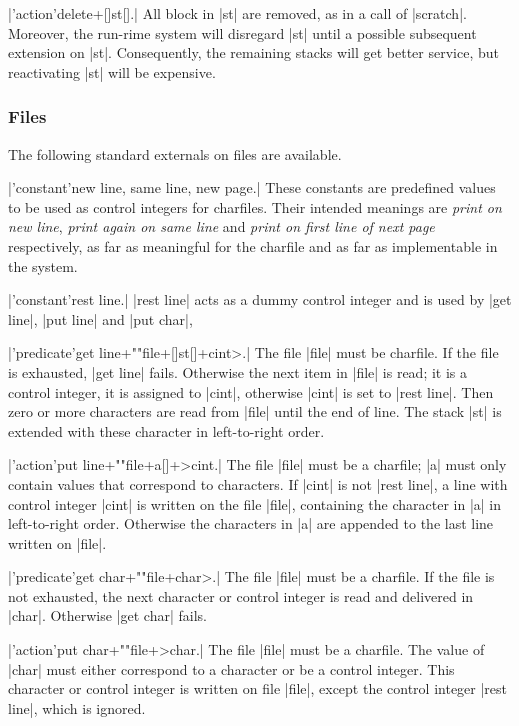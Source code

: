\documentclass{article}
\newcommand\g[1]{{\sf #1}}
\begin{document}
\X\pp|'action'delete+[]st[].|\Y
All block in \pp|st| are removed, as in a call of \pp|scratch|. Moreover,
the run-rime system will disregard \pp|st| until a possible subsequent
\g{extension} on \pp|st|. Consequently, the remaining stacks will get better
service, but reactivating \pp|st| will be expensive.

\subsubsection{Files}\label{5.2.5}

The following standard externals on files are available.

\X\pp|'constant'new line, same line, new page.|\Y
These constants are predefined values to be used as control integers for
\g{charfiles}. Their intended meanings are \emph{print on new line},
\emph{print again on same line} and \emph{print on first line of next page}
respectively, as far as meaningful for the \g{charfile} and as far as
implementable in the system.

\X\pp|'constant'rest line.|\Y
\pp|rest line| acts as a dummy control integer and is used by \pp|get line|,
\pp|put line| and \pp|put char|,

\X\pp|'predicate'get line+""file+[]st[]+cint>.|\Y
The file \pp|file| must be charfile. If the file is exhausted, \pp|get line|
fails. Otherwise the next item in \pp|file| is read; it is a control
integer, it is assigned to \pp|cint|, otherwise \pp|cint| is set to \pp|rest
line|. Then zero or more characters are read from \pp|file| until the end of
line. The stack \pp|st| is extended with these character in left-to-right
order.

\X\pp|'action'put line+""file+a[]+>cint.|\Y
The file \pp|file| must be a charfile; \pp|a| must only contain values that
correspond to characters. If \pp|cint| is not \pp|rest line|, a line with
control integer \pp|cint| is written on the file \pp|file|, containing the
character in \pp|a| in left-to-right order. Otherwise the characters in
\pp|a| are appended to the last line written on \pp|file|.

\X\pp|'predicate'get char+""file+char>.|\Y
The file \pp|file| must be a charfile. If the file is not exhausted, the
next character or control integer is read and delivered in \pp|char|.
Otherwise \pp|get char| fails.

\X\pp|'action'put char+""file+>char.|\Y
The file \pp|file| must be a charfile. The value of \pp|char| must either
correspond to a character or be a control integer. This character or control
integer is written on file \pp|file|, except the control integer \pp|rest
line|, which is ignored.
\end{document}
